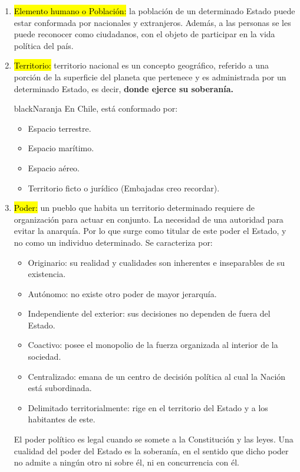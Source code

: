 \documentclass{templateApunte}
\newcommand{\hlcolor}[2]{{\sethlcolor{#1}\hl{#2}}}
\begin{document}
\begin{enumerate}
  \item \hlcolor{Verde!50}{Elemento humano o Población:} la población de un determinado Estado puede estar conformada por nacionales y extranjeros. Además, a las personas se les puede reconocer como ciudadanos, con el objeto de participar en la vida política del país.
  
  \item \hlcolor{Verde!50}{Territorio:} territorio nacional es un concepto geográfico, referido a una porción de la superficie del planeta que pertenece y es administrada por un determinado Estado, es decir, \textbf{donde ejerce su soberanía.}
  \begin{cPB}{black}{Naranja}
    En Chile, est\'a conformado por:
    \begin{itemize}
      \item Espacio terrestre.
      \item Espacio marítimo.
      \item Espacio aéreo.
      \item Territorio ficto o jurídico (Embajadas creo recordar).
    \end{itemize}
  \end{cPB}
  
  \item \hlcolor{Verde!50}{Poder:} un pueblo que habita un territorio determinado requiere de organización para actuar en conjunto. La necesidad de una autoridad para evitar la anarquía. Por lo que surge como titular de este poder el Estado, y no como un individuo determinado.
  Se caracteriza por:
  \begin{itemize}
    \item Originario: su realidad y cualidades son inherentes e inseparables de su existencia.
    \item Autónomo: no existe otro poder de mayor jerarquía.
    \item Independiente del exterior: sus decisiones no dependen de fuera del Estado.
    \item Coactivo: posee el monopolio de la fuerza organizada al interior de la sociedad.
    \item Centralizado: emana de un centro de decisión política al cual la Nación est\'a subordinada.
    \item Delimitado territorialmente: rige en el territorio del Estado y a los habitantes de este.
  \end{itemize}
  El poder político es legal cuando se somete a la Constitución y las leyes. Una cualidad del poder del Estado es la soberanía, en el sentido que dicho poder no admite a ningún otro ni sobre \'el, ni en concurrencia con \'el.
\end{enumerate}
\end{document}
